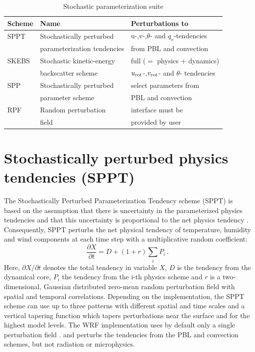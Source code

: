 \begin{table}[h!]
\begin{center}
\caption{Stochastic parameterization suite}
\begin{tabular}{ | l | l | l |}
\hline
Scheme          & Name & Perturbations to \\ 
\hline
SPPT  & Stochastically perturbed    &  u-,v-,$\theta$- and $q_v$-tendencies\\
      & parameterization tendencies &  from PBL and convection\\
SKEBS & Stochastic kinetic-energy   &  full ($=$ physics + dynamics) \\
      & backscatter scheme          &  $u_{\rm rot}$-,$v_{\rm rot}$- and $\theta$- tendencies\\ 
SPP & Stochastically perturbed      &  select parameters from\\
    & parameter scheme              &  PBL and convection \\
RPF & Random perturbation           &  interface must be \\
    & field                         &  provided by user\\
\hline
\end{tabular}
\end{center}
\label{stoch_table}
\end{table}

\section {Stochastically perturbed physics tendencies (SPPT)}
The Stochastically Perturbed Parameterization Tendency scheme
(SPPT) is based on the assumption that there is uncertainty
in the parameterized physics tendencies and that this 
uncertainty is proportional to the net physics tendency \citep{Bu99,Pa09}.
Consequently, SPPT perturbs the net physical tendency of temperature, 
humidity and wind components at each time step with a multiplicative 
random coefficient:
\begin{equation}
   \frac{\partial X}{\partial t}= D + (1+ r) \sum_i P_i \,.
\end{equation}
Here, ${\partial X}/{\partial t}$ denotes the total tendency in variable $X$, 
$D$ is the tendency from the dynamical core, 
$P_i$ the tendency from the i-th physics scheme 
and $r$ is a two-dimensional, Gaussian distributed zero-mean random
perturbation field with spatial and temporal correlations. 
Depending on
the implementation, the SPPT scheme can use up to three patterns with
different spatial and time scales and a vertical tapering function which 
tapers perturbations near the surface and for the highest model levels.
The WRF implementation uses by default only a single perturbation field \citep{Be15}.
and perturbs the tendencies from the PBL and convection schemes, but not radiation or 
microphysics.

